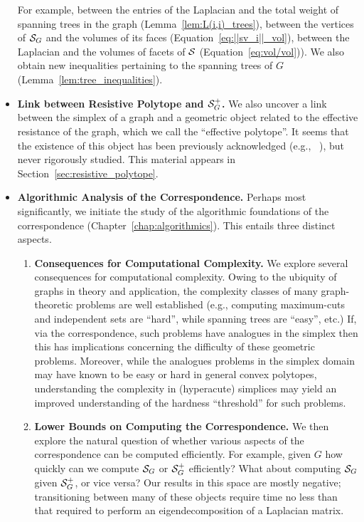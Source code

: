 \begin{itemize}
	For example, between the  entries of the Laplacian and the total  weight of spanning trees in  the graph (Lemma~\ref{lem:L(i,i)_trees}), between the vertices of $\mathcal{S}_G$  and the volumes of its faces (Equation~\eqref{eq:||sv_i||_vol}), between the Laplacian and the volumes of facets of $\mathcal{S}$ (Equation~\eqref{eq:vol/vol})). We also  obtain new inequalities pertaining to the spanning trees of $G$ (Lemma~\ref{lem:tree_inequalities}). 
	
	
	
	\item {\bf Link between Resistive Polytope and $\mathcal{S}_G^+$.} We also uncover a link between the simplex of a graph and a geometric  object related to the effective resistance of the graph, which we call the ``effective polytope''. It seems that the existence of this object has been previously acknowledged (e.g., ~\cite{shayanNotes}), but never rigorously studied. This material appears in Section~\ref{sec:resistive_polytope}. 
	\item {\bf Algorithmic Analysis of the Correspondence.} Perhaps most significantly, we initiate the study of the algorithmic foundations of the correspondence (Chapter~\ref{chap:algorithmics}). This entails three distinct aspects. 
	\begin{enumerate}
		\item {\bf Consequences for Computational Complexity.}	We explore several consequences for computational  complexity.  Owing to the ubiquity of graphs in theory and application, the complexity classes of many graph-theoretic problems are  well established (e.g., computing maximum-cuts and independent sets are ``hard'', while spanning trees are ``easy'', etc.) If, via the correspondence, such problems have analogues in the simplex then this has implications concerning the difficulty of these geometric problems. Moreover, while the analogues problems in the simplex domain may have known to be easy or hard  in general convex polytopes, understanding the complexity in (hyperacute) simplices may yield an improved understanding of the hardness ``threshold'' for such problems. 
		\item {\bf Lower Bounds on Computing the Correspondence.} We then explore the natural question of whether various aspects of the correspondence can be computed efficiently. For example, given $G$ how quickly can we compute $\mathcal{S}_G$ or $\mathcal{S}_G^+$ efficiently? What about computing $\mathcal{S}_G$ given $\mathcal{S}_G^+$, or vice  versa? Our results in this  space are mostly negative; transitioning between many of these objects require time no less than that required to perform an eigendecomposition of a Laplacian matrix. 

\end{enumerate}
\end{itemize}
